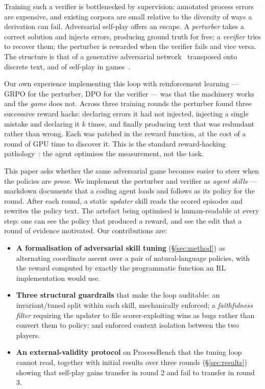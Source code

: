 \documentclass{article} %
\begin{document}
Training such a verifier is bottlenecked by supervision: annotated process errors are
expensive, and existing corpora are small relative to the diversity of ways a derivation can
fail. Adversarial self-play offers an escape. A \emph{perturber} takes a correct solution
and injects errors, producing ground truth for free; a \emph{verifier} tries to recover
them; the perturber is rewarded when the verifier fails and vice versa. The structure is
that of a generative adversarial network~\citep{goodfellow2014generative} transposed onto
discrete text, and of self-play in games~\citep{silver2017mastering}.

Our own experience implementing this loop with reinforcement learning --- GRPO
\citep{shao2024deepseekmath} for the perturber, DPO \citep{rafailov2023direct} for the
verifier --- was that the machinery works and the \emph{game} does not. Across three
training rounds the perturber found three successive reward hacks: declaring errors it had
not injected, injecting a single mistake and declaring it $k$ times, and finally producing
text that was redundant rather than wrong. Each was patched in the reward function, at the
cost of a round of GPU time to discover it. This is the standard reward-hacking
pathology~\citep{skalse2022defining}: the agent optimises the measurement, not the task.

This paper asks whether the same adversarial game becomes easier to steer when the policies
are \emph{prose}. We implement the perturber and verifier as \emph{agent skills} --- markdown
documents that a coding agent \citep{anthropic2025claudecode} loads and follows as its
policy for the round. After each round, a static \emph{updater} skill reads the scored
episodes and rewrites the policy text. The artefact being optimised is human-readable at
every step: one can see the policy that produced a reward, and see the edit that a round of
evidence motivated. Our contributions are:

\begin{itemize}
\item \textbf{A formalisation of adversarial skill tuning} (\S\ref{sec:method}) as
alternating coordinate ascent over a pair of natural-language policies, with the reward
computed by exactly the programmatic function an RL implementation would use.
\item \textbf{Three structural guardrails} that make the loop auditable: an
invariant/tuned split within each skill, mechanically enforced; a
\emph{faithfulness filter} requiring the updater to file scorer-exploiting wins as bugs
rather than convert them to policy; and enforced context isolation between the two players.
\item \textbf{An external-validity protocol} on ProcessBench that the tuning loop cannot
read, together with initial results over three rounds (\S\ref{sec:results}) showing that
self-play gains transfer in round 2 and fail to transfer in round 3.
\end{itemize}
\end{document}
